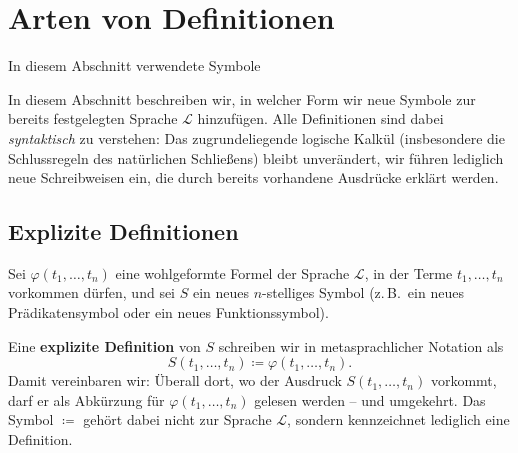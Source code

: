 \documentclass[main.tex]{subfiles}
\begin{document}
\section{Arten von Definitionen}

\begin{DeltaContext}{In diesem Abschnitt verwendete Symbole}
\end{DeltaContext}

In diesem Abschnitt beschreiben wir, in welcher Form wir neue
Symbole zur bereits festgelegten Sprache \(\mathcal L\) hinzufügen.
Alle Definitionen sind dabei \emph{syntaktisch} zu verstehen:
Das zugrundeliegende logische Kalkül (insbesondere die
Schlussregeln des natürlichen Schließens) bleibt unverändert, wir
führen lediglich neue Schreibweisen ein, die durch bereits
vorhandene Ausdrücke erklärt werden.

\subsection{Explizite Definitionen}

\begin{definition}
Sei \(\varphi(t_1,\dots,t_n)\) eine wohlgeformte Formel der
Sprache \(\mathcal L\), in der Terme \(t_1,\dots,t_n\) vorkommen
dürfen, und sei \(S\) ein neues \(n\)-stelliges Symbol (z.\,B.\ ein
neues Prädikatensymbol oder ein neues Funktionssymbol).

Eine \textbf{explizite Definition} von \(S\) schreiben wir in
metasprachlicher Notation als
\[
  S(t_1,\dots,t_n) \coloneqq \varphi(t_1,\dots,t_n).
\]
Damit vereinbaren wir: Überall dort, wo der Ausdruck
\(S(t_1,\dots,t_n)\) vorkommt, darf er als Abkürzung für
\(\varphi(t_1,\dots,t_n)\) gelesen werden – und umgekehrt.
Das Symbol \(\coloneqq\) gehört dabei nicht zur Sprache
\(\mathcal L\), sondern kennzeichnet lediglich eine Definition.
\end{definition}
\end{document}
